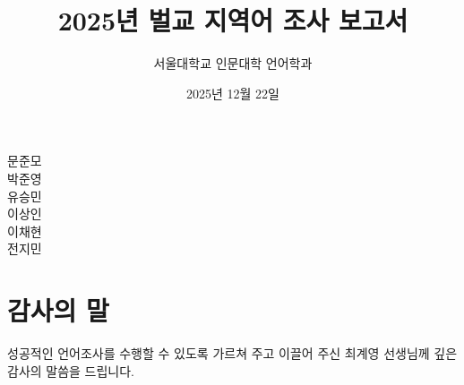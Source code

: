 \documentclass{snu-fl-report}
\title{2025년 벌교 지역어 조사 보고서}
\author{서울대학교 인문대학 언어학과}
\date{2025년 12월 22일}
\newif\ifinternal
\begin{document}
\frontmatter
\begin{titlingpage}
  \maketitle
  \vfill
  \begin{flushleft}
    \setlength{\leftskip}{1cm}
    \fontsize{14pt}{14pt}\selectfont\sffamily\mdseries
    문준모 \\ 박준영 \\ 유승민 \\ 이상인 \\ 이채현 \\ 전지민 \\
  \end{flushleft}
  \hspace*{1.75cm}
\end{titlingpage}

\tableofcontents



\mainmatter











\appendix




\ifinternal
  
\else
  
\fi

\backmatter
\chapter*{감사의 말}
성공적인 언어조사를 수행할 수 있도록 가르쳐 주고 이끌어 주신 최계영 선생님께 깊은 감사의 말씀을 드립니다.

\newpage
\makecolophon
\end{document}
